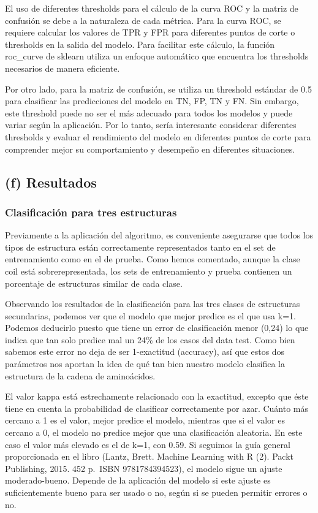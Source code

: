 \documentclass[
]{article}
\begin{document}
El uso de diferentes thresholds para el cálculo de la curva ROC y la
matriz de confusión se debe a la naturaleza de cada métrica. Para la
curva ROC, se requiere calcular los valores de TPR y FPR para diferentes
puntos de corte o thresholds en la salida del modelo. Para facilitar
este cálculo, la función roc\_curve de sklearn utiliza un enfoque
automático que encuentra los thresholds necesarios de manera eficiente.

Por otro lado, para la matriz de confusión, se utiliza un threshold
estándar de 0.5 para clasificar las predicciones del modelo en TN, FP,
TN y FN. Sin embargo, este threshold puede no ser el más adecuado para
todos los modelos y puede variar según la aplicación. Por lo tanto,
sería interesante considerar diferentes thresholds y evaluar el
rendimiento del modelo en diferentes puntos de corte para comprender
mejor su comportamiento y desempeño en diferentes situaciones.

\hypertarget{f-resultados}{%
\subsection{(f) Resultados}\label{f-resultados}}

\hypertarget{clasificaciuxf3n-para-tres-estructuras}{%
\subsubsection{Clasificación para tres
estructuras}\label{clasificaciuxf3n-para-tres-estructuras}}

Previamente a la aplicación del algoritmo, es conveniente asegurarse que
todos los tipos de estructura están correctamente representados tanto en
el set de entrenamiento como en el de prueba. Como hemos comentado,
aunque la clase coil está sobrerepresentada, los sets de entrenamiento y
prueba contienen un porcentaje de estructuras similar de cada clase.

Observando los resultados de la clasificación para las tres clases de
estructuras secundarias, podemos ver que el modelo que mejor predice es
el que usa k=1. Podemos deducirlo puesto que tiene un error de
clasificación menor (0,24) lo que indica que tan solo predice mal un
24\% de los casos del data test. Como bien sabemos este error no deja de
ser 1-exactitud (accuracy), así que estos dos parámetros nos aportan la
idea de qué tan bien nuestro modelo clasifica la estructura de la cadena
de aminoácidos.

El valor kappa está estrechamente relacionado con la exactitud, excepto
que éste tiene en cuenta la probabilidad de clasificar correctamente por
azar. Cuánto más cercano a 1 es el valor, mejor predice el modelo,
mientras que si el valor es cercano a 0, el modelo no predice mejor que
una clasificación aleatoria. En este caso el valor más elevado es el de
k=1, con 0.59. Si seguimos la guía general proporcionada en el libro
(Lantz, Brett. Machine Learning with R (2). Packt Publishing, 2015. 452
p.~ISBN 9781784394523), el modelo sigue un ajuste moderado-bueno.
Depende de la aplicación del modelo si este ajuste es suficientemente
bueno para ser usado o no, según si se pueden permitir errores o no.
\end{document}
